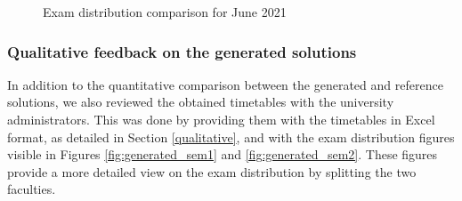 \begin{figure}[H]
  \centering
  \hfill
  \caption{Exam distribution comparison for June 2021}
  \label{fig:sem2_comparison}
\end{figure}

\subsubsection{Qualitative feedback on the generated solutions}

In addition to the quantitative comparison between the generated and reference solutions, we also reviewed the obtained timetables with the university administrators. This was done by providing them with the timetables in Excel format, as detailed in Section \ref{qualitative}, and with the exam distribution figures visible in Figures 
\ref{fig:generated_sem1} and \ref{fig:generated_sem2}. These figures provide a more detailed view on the exam distribution by splitting the two faculties. 

